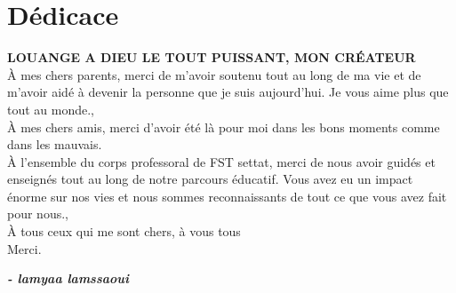 \chapter*{Dédicace}


\begin{center}
\large{
\textbf{\large LOUANGE A DIEU LE TOUT PUISSANT, MON CRÉATEUR} \\[12pt]
\uppercase{à} mes chers parents, merci de m'avoir soutenu tout au long de ma vie et de m'avoir aidé à devenir la personne que je suis aujourd'hui. Je vous aime plus que tout au monde.,\\[12pt]
\uppercase{à} mes chers amis, merci d'avoir été là pour moi dans les bons moments comme dans les mauvais.\\[12pt]
\uppercase{à} l'ensemble du corps professoral de FST settat, merci de nous avoir guidés et enseignés tout au long de notre parcours éducatif. Vous avez eu un impact énorme sur nos vies et nous sommes reconnaissants de tout ce que vous avez fait pour nous.,\\[12pt]
\uppercase{à} tous ceux qui me sont chers, à vous tous\\[12pt]
Merci.
}
\end{center}
\bigskip
\medskip


\hspace*{\fill} \textbf{\textit{\large{- lamyaa lamssaoui}}}


\clearpage
